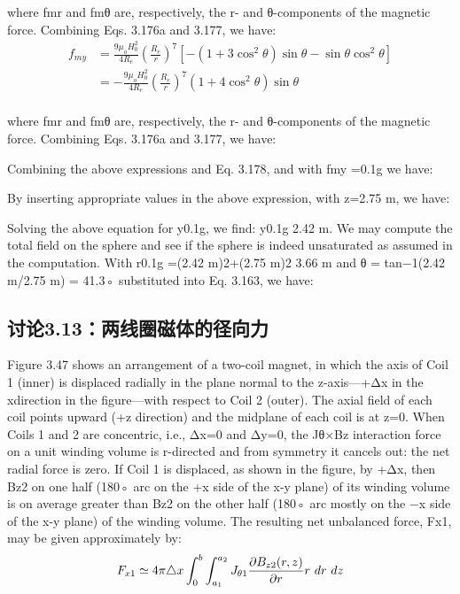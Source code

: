 where fmr and fmθ are, respectively, the r- and θ-components of the magnetic
force. Combining Eqs. 3.176a and 3.177, we have:
\begin{equation}
\begin{split}
f_{my}&=\frac{9\mu_{o}H_{0}^{2}}{4R_{e}}(\frac{R_{e}}{r})^{7}[-(1+3\cos^{2}\theta)\sin\theta-\sin\theta\cos^{2}\theta]\\
&=-\frac{9\mu_{o}H_{0}^{2}}{4R_{e}}(\frac{R_{e}}{r})^{7}(1+4\cos^{2}\theta)\sin\theta\\%
\end{split}
\end{equation}

where fmr and fmθ are, respectively, the r- and θ-components of the magnetic
force. Combining Eqs. 3.176a and 3.177, we have:

Combining the above expressions and Eq. 3.178, and with fmy =0.1g we have:

By inserting appropriate values in the above expression, with z=2.75 m, we have:

Solving the above equation for y0.1g, we find: y0.1g  2.42 m.
We may compute the total field on the sphere and see if the sphere is indeed unsaturated as assumed in the computation. With r0.1g =(2.42 m)2+(2.75 m)2 
3.66 m and θ = tan−1(2.42 m/2.75 m) = 41.3◦ substituted into Eq. 3.163, we have:

\newpage




\subsection{讨论3.13：两线圈磁体的径向力}
Figure 3.47 shows an arrangement of a two-coil magnet, in which the axis of Coil
1 (inner) is displaced radially in the plane normal to the z-axis—+Δx in the xdirection in the figure—with respect to Coil 2 (outer). The axial field of each coil
points upward (+z direction) and the midplane of each coil is at z=0.
When Coils 1 and 2 are concentric, i.e., Δx=0 and Δy=0, the Jθ×Bz interaction
force on a unit winding volume is r-directed and from symmetry it cancels out:
the net radial force is zero. If Coil 1 is displaced, as shown in the figure, by +Δx,
then Bz2 on one half (180◦ arc on the +x side of the x-y plane) of its winding
volume is on average greater than Bz2 on the other half (180◦ arc mostly on the
−x side of the x-y plane) of the winding volume. The resulting net unbalanced
force, Fx1, may be given approximately by:
\begin{equation}%
F_{x1}\simeq4\pi\triangle x\int_{0}^{b}\int_{a_{1}}^{a_{2}}J_{\theta1}\frac{\partial B_{z2}(r,z)}{\partial r}r\ dr\ dz\\
\end{equation}

